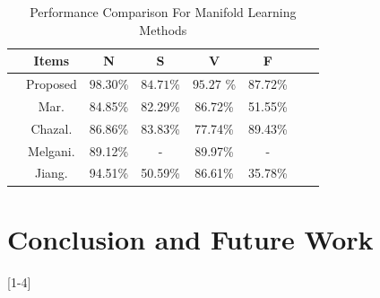 \documentclass[journal]{IEEEtran}
\begin{document}
\begin{table}[!h]
\begin{center}
\begin{threeparttable}
\caption{Performance Comparison For Manifold Learning Methods}
\label{table1}
\begin{tabular}{cccccccc}
\hline
&  Items & N & S & V & F   \\
\hline

&Proposed &$\bm{98.30}$\% & $\bm{84.71}$\% & $\bm{95.27}$ \%& $\bm{87.72}$\%\\
& Mar. \cite{mar}  &84.85\% & 82.29\% & 86.72\% &51.55\%      \\


& Chazal. \cite{chaza} &86.86\% & 83.83\%  & 77.74\% & 89.43\%      \\

& Melgani.\cite{melgan}  &89.12\% & -  & 89.97\%  & -       \\

& Jiang.\cite{jiang}  & 94.51\% & 50.59\%  & 86.61\% & 35.78\%       \\

\hline
\end{tabular}
\end{threeparttable}
\end{center}
\end{table}
     



%
%

\section{Conclusion and Future Work}


[1-4]



%
%
\end{document}
